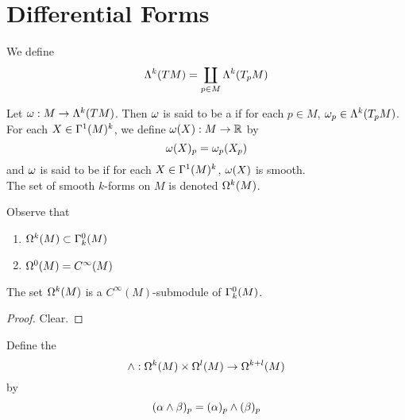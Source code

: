 \documentclass{book}
\begin{document}
	
	
	
	
	
	
	
	
	
	
	
	
	
	
	
	
	
	
	

	
	\newpage	
	\section{Differential Forms}
	
	\begin{defn}
		We define $$\Lambda^k (TM) = \coprod_{p \in M} \Lambda^k(T_p M)$$
	\end{defn}
	
	\begin{defn}
		Let $\omega: M \rightarrow \Lambda^k (TM)$. Then $\omega$ is said to be a  if for each $p \in M$, $\omega_p \in \Lambda^k(T_pM)$.\\
		For each $X \in \Gamma^1(M)^k$, we define $\omega(X) : M \rightarrow \mathbb{R}$ by $$\omega(X)_p = \omega_p(X_p)$$
		and $\omega$ is said to be  if for each $X \in \Gamma^1(M)^k$, $\omega(X)$ is smooth.\\
		The set of smooth $k$-forms on $M$ is denoted $\Omega^k(M)$.\\
	\end{defn} 

	\begin{note}
		Observe that 
		\begin{enumerate}
		\item $\Omega^k(M) \subset \Gamma^0_k(M)$
		\item $\Omega^0(M) = C^{\infty}(M)$
		\end{enumerate}
	\end{note}
	
	\begin{ex}
	The set $\Omega^k(M)$ is a $C^{\infty}(M)$-submodule of $\Gamma^0_k(M)$.
	\end{ex}
	
	\begin{proof}
	Clear.
	\end{proof}

	

	\begin{defn}
		Define the  $$\wedge: \Omega^k(M) \times \Omega^l(M) \rightarrow \Omega^{k+l}(M) $$ by $$(\alpha \wedge \beta)_p = (\alpha)_p \wedge (\beta)_p$$
	\end{defn}
	
\end{document}
